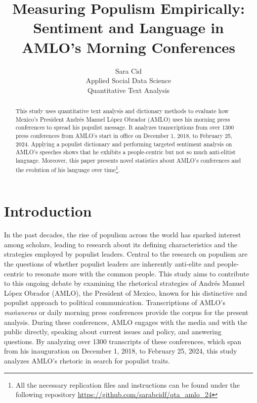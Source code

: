 \documentclass[]{article}
\title{Measuring Populism Empirically: Sentiment and Language in AMLO's Morning Conferences}
\author{Sara Cid \\  Applied Social Data Science \\  Quantitative Text Analysis}
\begin{document}
\maketitle

\begin{abstract}
	
	This study uses quantitative text analysis and dictionary methods to evaluate how Mexico's President Andrés Manuel López Obrador (AMLO) uses his morning press conferences to spread his populist message. It analyzes transcriptions from over 1300 press conferences from AMLO's start in office on December 1, 2018, to February 25, 2024. Applying a populist dictionary and performing targeted sentiment analysis on AMLO's speeches shows that he exhibits a people-centric but not so much anti-elitist language. Moreover, this paper presents novel statistics about AMLO's conferences and the evolution of his language over time\footnote{All the necessary replication files and instructions can be found under the following repository \url{https://github.com/sarabcidf/qta_amlo_24}}.

\end{abstract}

\section{Introduction} 

In the past decades, the rise of populism across the world has sparked interest among scholars, leading to research about its defining characteristics and the strategies employed by populist leaders. Central to the research on populism are the questions of whether populist leaders are inherently anti-elite and people-centric to resonate more with the common people. This study aims to contribute to this ongoing debate by examining the rhetorical strategies of Andrés Manuel López Obrador (AMLO), the President of Mexico, known for his distinctive and populist approach to political communication. Transcriptions of AMLO's \textit{mañaneras} or daily morning press conferences provide the corpus for the present analysis. During these conferences, AMLO engages with the media and with the public directly, speaking about current issues and policy, and answering questions. By analyzing over 1300 transcripts of these conferences, which span from his inauguration on December 1, 2018, to February 25, 2024, this study analyzes AMLO's rhetoric in search for populist traits.  
\end{document}
